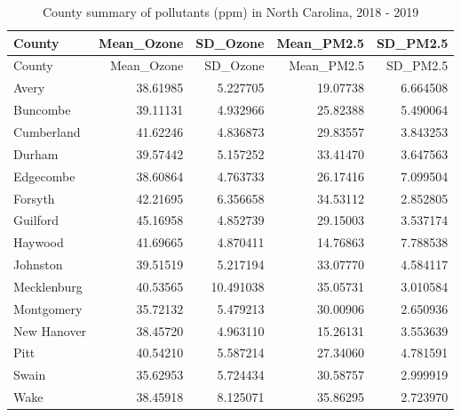 \documentclass[
  12pt,
]{article}
\begin{document}
\begin{longtable}[]{@{}lrrrr@{}}
\caption{County summary of pollutants (ppm) in North Carolina, 2018 -
2019}\tabularnewline
\toprule
County & Mean\_Ozone & SD\_Ozone & Mean\_PM2.5 & SD\_PM2.5 \\
\midrule
\endfirsthead
\toprule
County & Mean\_Ozone & SD\_Ozone & Mean\_PM2.5 & SD\_PM2.5 \\
\midrule
\endhead
Avery & 38.61985 & 5.227705 & 19.07738 & 6.664508 \\
Buncombe & 39.11131 & 4.932966 & 25.82388 & 5.490064 \\
Cumberland & 41.62246 & 4.836873 & 29.83557 & 3.843253 \\
Durham & 39.57442 & 5.157252 & 33.41470 & 3.647563 \\
Edgecombe & 38.60864 & 4.763733 & 26.17416 & 7.099504 \\
Forsyth & 42.21695 & 6.356658 & 34.53112 & 2.852805 \\
Guilford & 45.16958 & 4.852739 & 29.15003 & 3.537174 \\
Haywood & 41.69665 & 4.870411 & 14.76863 & 7.788538 \\
Johnston & 39.51519 & 5.217194 & 33.07770 & 4.584117 \\
Mecklenburg & 40.53565 & 10.491038 & 35.05731 & 3.010584 \\
Montgomery & 35.72132 & 5.479213 & 30.00906 & 2.650936 \\
New Hanover & 38.45720 & 4.963110 & 15.26131 & 3.553639 \\
Pitt & 40.54210 & 5.587214 & 27.34060 & 4.781591 \\
Swain & 35.62953 & 5.724434 & 30.58757 & 2.999919 \\
Wake & 38.45918 & 8.125071 & 35.86295 & 2.723970 \\
\bottomrule
\end{longtable}
\end{document}
